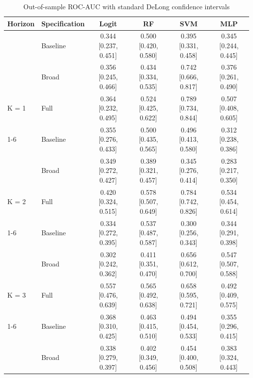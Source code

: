 \begin{table}

\caption{\label{tab:roc_ci_main}Out-of-sample ROC-AUC with standard DeLong confidence intervals}
\centering
\begin{threeparttable}
\begin{tabular}[t]{llcccc}
\toprule
Horizon & Specification & Logit & RF & SVM & MLP\\
\midrule
 & Baseline & 0.344 [0.237, 0.451] & 0.500 [0.420, 0.580] & 0.395 [0.331, 0.458] & 0.345 [0.244, 0.445]\\

 & Broad & 0.356 [0.245, 0.466] & 0.434 [0.334, 0.535] & 0.742 [0.666, 0.817] & 0.376 [0.261, 0.490]\\

\multirow[t]{-2}{*}[\normalbaselineskip]{\raggedright\arraybackslash K = 1} & Full & 0.364 [0.232, 0.495] & 0.524 [0.425, 0.622] & 0.789 [0.734, 0.844] & 0.507 [0.408, 0.605]\\
\cmidrule{1-6}
 & Baseline & 0.355 [0.276, 0.433] & 0.500 [0.435, 0.565] & 0.496 [0.413, 0.580] & 0.312 [0.238, 0.386]\\

 & Broad & 0.349 [0.272, 0.427] & 0.389 [0.321, 0.457] & 0.345 [0.276, 0.414] & 0.283 [0.217, 0.350]\\

\multirow[t]{-2}{*}[\normalbaselineskip]{\raggedright\arraybackslash K = 2} & Full & 0.420 [0.324, 0.515] & 0.578 [0.507, 0.649] & 0.784 [0.742, 0.826] & 0.534 [0.454, 0.614]\\
\cmidrule{1-6}
 & Baseline & 0.334 [0.272, 0.395] & 0.537 [0.487, 0.587] & 0.300 [0.256, 0.343] & 0.344 [0.291, 0.398]\\

 & Broad & 0.302 [0.242, 0.362] & 0.411 [0.351, 0.470] & 0.656 [0.612, 0.700] & 0.547 [0.507, 0.588]\\

\multirow[t]{-2}{*}[\normalbaselineskip]{\raggedright\arraybackslash K = 3} & Full & 0.557 [0.476, 0.639] & 0.565 [0.492, 0.638] & 0.658 [0.595, 0.721] & 0.492 [0.409, 0.575]\\
\cmidrule{1-6}
 & Baseline & 0.368 [0.310, 0.425] & 0.463 [0.415, 0.510] & 0.494 [0.454, 0.533] & 0.355 [0.296, 0.415]\\

 & Broad & 0.338 [0.279, 0.397] & 0.402 [0.349, 0.456] & 0.454 [0.400, 0.508] & 0.383 [0.324, 0.443]\\


\end{tabular}
\end{threeparttable}
\end{table}
